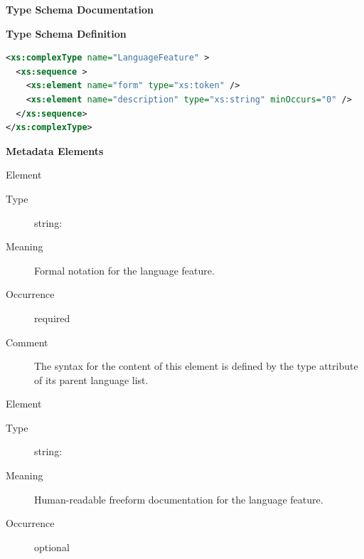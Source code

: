 \documentclass{ivoa}
\begin{document}
\begin{generated}
\begingroup
      	\renewcommand*\descriptionlabel[1]{%
      	\hbox to 5.5em{\emph{#1}\hfil}}\vspace{2ex}\noindent\textbf{ Type Schema Documentation}


\vspace{1ex}\noindent\textbf{ Type Schema Definition}

\begin{lstlisting}[language=XML,basicstyle=\footnotesize]
<xs:complexType name="LanguageFeature" >
  <xs:sequence >
    <xs:element name="form" type="xs:token" />
    <xs:element name="description" type="xs:string" minOccurs="0" />
  </xs:sequence>
</xs:complexType>
\end{lstlisting}

\vspace{0.5ex}\noindent\textbf{ Metadata Elements}

\begingroup\small\begin{bigdescription}\item[Element \xmlel{form}]
\begin{description}
\item[Type] string: 
\item[Meaning] 
            Formal notation for the language feature.
          
\item[Occurrence] required
\item[Comment] 
            The syntax for the content of this element is defined by the
            type attribute of its parent language list.
          

\end{description}
\item[Element \xmlel{description}]
\begin{description}
\item[Type] string: 
\item[Meaning] 
            Human-readable freeform documentation for the language feature.
          
\item[Occurrence] optional

\end{description}


\end{bigdescription}\endgroup

\endgroup
\end{generated}
\end{document}
